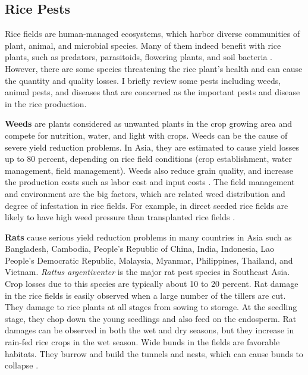 \subsection*{Rice Pests}

Rice fields are human-managed ecosystems, which harbor diverse communities of plant, animal, and microbial species. Many of them indeed benefit with rice plants, such as predators, parasitoids, flowering plants, and soil bacteria \citep{Norton_2010_Rice}. However, there are some species threatening the rice plant's health and can cause the quantity and quality losses. I briefly review some pests including weeds, animal pests, and diseases that are concerned as the important pests and disease in the rice production.


\textbf{Weeds} are plants considered as unwanted plants in the crop growing area and compete for nutrition, water, and light with crops. Weeds can be the cause of severe yield reduction problems. In Asia, they are estimated to cause yield losses up to 80 percent, depending on rice field conditions (crop establishment, water management, field management). Weeds also reduce grain quality, and increase the production costs such as labor cost and input costs \citep{Litsinger_1991_Crop,Savary_2005_Multiple}. The field management and environment are the big factors, which are related weed distribution and degree of infestation in rice fields. For example, in direct seeded rice fields are likely to have high weed pressure than transplanted rice fields \cite{Juraimi_2013_Sustainable}.

\textbf{Rats} cause serious yield reduction problems in many countries in Asia such as Bangladesh, Cambodia, People's Republic of China, India, Indonesia, Lao People's Democratic Republic, Malaysia, Myanmar, Philippines, Thailand, and Vietnam. \textit{Rattus argentiventer} is the major rat pest species in Southeast Asia. Crop losses due to this species are typically about 10 to 20 percent. Rat damage in the rice fields is easily observed when a large number of the tillers are cut. They damage to rice plants at all stages from sowing to storage. At the seedling stage, they chop down the young seedlings and also feed on the endosperm. Rat damages can be observed in both the wet and dry seasons, but they increase in rain-fed rice crops in the wet season. Wide bunds in the fields are favorable habitats. They burrow and build the tunnels and nests, which can cause bunds to collapse \citep{Singleton_2003_Impacts}.


